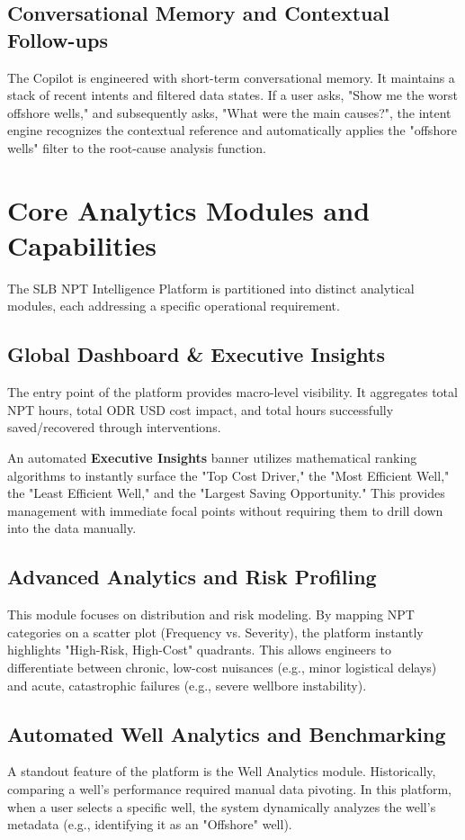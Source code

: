\documentclass[11pt,a4paper]{article}
\begin{document}
\subsection{Conversational Memory and Contextual Follow-ups}
The Copilot is engineered with short-term conversational memory. It maintains a stack of recent intents and filtered data states. If a user asks, "Show me the worst offshore wells," and subsequently asks, "What were the main causes?", the intent engine recognizes the contextual reference and automatically applies the "offshore wells" filter to the root-cause analysis function.

\section{Core Analytics Modules and Capabilities}
The SLB NPT Intelligence Platform is partitioned into distinct analytical modules, each addressing a specific operational requirement.

\subsection{Global Dashboard \& Executive Insights}
The entry point of the platform provides macro-level visibility. It aggregates total NPT hours, total ODR USD cost impact, and total hours successfully saved/recovered through interventions. 

An automated \textbf{Executive Insights} banner utilizes mathematical ranking algorithms to instantly surface the "Top Cost Driver," the "Most Efficient Well," the "Least Efficient Well," and the "Largest Saving Opportunity." This provides management with immediate focal points without requiring them to drill down into the data manually.

\subsection{Advanced Analytics and Risk Profiling}
This module focuses on distribution and risk modeling. By mapping NPT categories on a scatter plot (Frequency vs. Severity), the platform instantly highlights "High-Risk, High-Cost" quadrants. This allows engineers to differentiate between chronic, low-cost nuisances (e.g., minor logistical delays) and acute, catastrophic failures (e.g., severe wellbore instability).

\subsection{Automated Well Analytics and Benchmarking}
A standout feature of the platform is the Well Analytics module. Historically, comparing a well's performance required manual data pivoting. In this platform, when a user selects a specific well, the system dynamically analyzes the well's metadata (e.g., identifying it as an "Offshore" well). 
\end{document}
